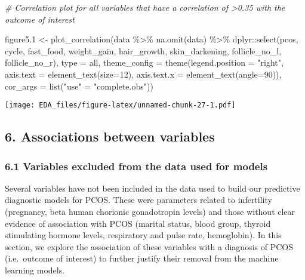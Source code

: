 \documentclass[
]{article}
\newenvironment{Shaded}{\begin{snugshade}}{\end{snugshade}}
\newcommand{\AttributeTok}[1]{\textcolor[rgb]{0.77,0.63,0.00}{#1}}
\newcommand{\CommentTok}[1]{\textcolor[rgb]{0.56,0.35,0.01}{\textit{#1}}}
\newcommand{\DecValTok}[1]{\textcolor[rgb]{0.00,0.00,0.81}{#1}}
\newcommand{\FloatTok}[1]{\textcolor[rgb]{0.00,0.00,0.81}{#1}}
\newcommand{\FunctionTok}[1]{\textcolor[rgb]{0.00,0.00,0.00}{#1}}
\newcommand{\NormalTok}[1]{#1}
\newcommand{\OtherTok}[1]{\textcolor[rgb]{0.56,0.35,0.01}{#1}}
\newcommand{\SpecialCharTok}[1]{\textcolor[rgb]{0.00,0.00,0.00}{#1}}
\newcommand{\StringTok}[1]{\textcolor[rgb]{0.31,0.60,0.02}{#1}}
\begin{document}
\begin{Shaded}
\begin{Highlighting}[]
\CommentTok{\# Correlation plot for all variables that have a correlation of \textgreater{}0.35 with the outcome of interest}

\NormalTok{figure5}\FloatTok{.1} \OtherTok{\textless{}{-}} \FunctionTok{plot\_correlation}\NormalTok{(data }\SpecialCharTok{\%\textgreater{}\%} \FunctionTok{na.omit}\NormalTok{(data) }\SpecialCharTok{\%\textgreater{}\%}\NormalTok{ dplyr}\SpecialCharTok{::}\FunctionTok{select}\NormalTok{(pcos, cycle, fast\_food, weight\_gain, hair\_growth, skin\_darkening, follicle\_no\_l, follicle\_no\_r), }
                              \AttributeTok{type =} \StringTok{\textquotesingle{}all\textquotesingle{}}\NormalTok{,}
                              \AttributeTok{theme\_config =} \FunctionTok{theme}\NormalTok{(}\AttributeTok{legend.position =} \StringTok{"right"}\NormalTok{, }\AttributeTok{axis.text =} \FunctionTok{element\_text}\NormalTok{(}\AttributeTok{size=}\DecValTok{12}\NormalTok{), }\AttributeTok{axis.text.x =} \FunctionTok{element\_text}\NormalTok{(}\AttributeTok{angle=}\DecValTok{90}\NormalTok{)),}
                              \AttributeTok{cor\_args =} \FunctionTok{list}\NormalTok{(}\StringTok{"use"} \OtherTok{=} \StringTok{"complete.obs"}\NormalTok{))}
\end{Highlighting}
\end{Shaded}

\texttt{[image: EDA\_files/figure-latex/unnamed-chunk-27-1.pdf]}

\hypertarget{associations-between-variables}{%
\subsection{6. Associations between
variables}\label{associations-between-variables}}

\hypertarget{variables-excluded-from-the-data-used-for-models}{%
\subsubsection{6.1 Variables excluded from the data used for
models}\label{variables-excluded-from-the-data-used-for-models}}

Several variables have not been included in the data used to build our
predictive diagnostic models for PCOS. These were parameters related to
infertility (pregnancy, beta human chorionic gonadotropin levels) and
those without clear evidence of association with PCOS (marital status,
blood group, thyroid stimulating hormone levels, respiratory and pulse
rate, hemoglobin). In this section, we explore the association of these
variables with a diagnosis of PCOS (i.e.~outcome of interest) to further
justify their removal from the machine learning models.
\end{document}
